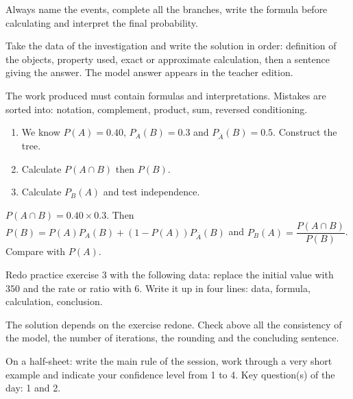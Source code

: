 \begin{summary}Always name the events, complete all the branches, write the formula before calculating and interpret the final probability.\end{summary}

\begin{example}
Take the data of the investigation and write the solution in order: definition of the objects, property used, exact or approximate calculation, then a sentence giving the answer. The model answer appears in the teacher edition.
\end{example}
\begin{solution}The work produced must contain formulas and interpretations. Mistakes are sorted into: notation, complement, product, sum, reversed conditioning.\end{solution}

\begin{exercise}[essential]
\begin{enumerate}\item We know $P(A)=\num{0,40}$, $P_A(B)=\num{0,3}$ and $P_{\overline A}(B)=\num{0,5}$. Construct the tree.\item Calculate $P(A\cap B)$ then $P(B)$.\item Calculate $P_B(A)$ and test independence.\end{enumerate}
\end{exercise}
\begin{solution}$P(A\cap B)=\num{0,40}\times\num{0,3}$. Then $P(B)=P(A)P_A(B)+(1-P(A))P_{\overline A}(B)$ and $P_B(A)=\dfrac{P(A\cap B)}{P(B)}$. Compare with $P(A)$.\end{solution}


\begin{homework}Redo practice exercise 3 with the following data: replace the initial value with $350$ and the rate or ratio with $6$. Write it up in four lines: data, formula, calculation, conclusion.\end{homework}
\begin{solution}The solution depends on the exercise redone. Check above all the consistency of the model, the number of iterations, the rounding and the concluding sentence.\end{solution}

\begin{exitticket}[3 minutes]On a half-sheet: write the main rule of the session, work through a very short example and indicate your confidence level from 1 to 4. Key question(s) of the day: 1 and 2.\end{exitticket}

